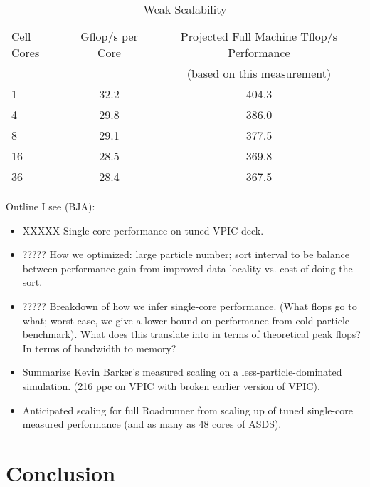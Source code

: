 \documentclass[10pt]{article}
\begin{document}
\begin{table}
\caption{\label{tbl:ASDS_Weak_Scalability}
Weak Scalability}

\begin{center}
\begin{tabular}{l c c}
\hline
\hline
Cell Cores & Gflop/s per Core & Projected Full Machine Tflop/s Performance \\
 & & (based on this measurement) \\
\hline
1 & 32.2 & 404.3 \\
4 & 29.8 & 386.0 \\
8 & 29.1 & 377.5 \\
16 & 28.5 & 369.8 \\
36 & 28.4 & 367.5 \\
\hline
\end{tabular}
\end{center}
\end{table}

Outline I see (BJA):  
\begin{itemize}
\item XXXXX Single core performance on tuned VPIC deck.

\item ????? How we optimized:  large particle number; sort interval to be 
balance between performance gain from improved data locality vs. 
cost of doing the sort. 

\item ????? Breakdown of how we infer single-core performance.  (What flops go to 
what; worst-case, we give a lower bound on performance from cold particle
benchmark).  What does this translate into in terms of theoretical peak 
flops?  In terms of bandwidth to memory? 

\item Summarize Kevin Barker's measured scaling on a less-particle-dominated 
simulation.  (216 ppc on VPIC with broken earlier version of VPIC). 

\item Anticipated scaling for full Roadrunner from scaling up of tuned 
single-core measured performance (and as many as 48 cores of ASDS).  

\end{itemize}

\section{Conclusion}

\begin{singlespace}


\end{singlespace}

\end{document}
